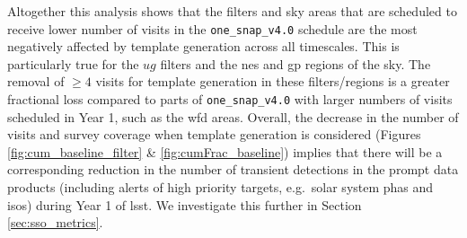 \documentclass[preprintm,linenumbers]{aastex631}
\newcommand{\baseline}{\texttt{one\_snap\_v4.0}\xspace}
\begin{document}
  Altogether this analysis shows that the filters and sky areas that are scheduled to receive lower number of visits in the \baseline schedule are the most negatively affected by template generation across all timescales.
  This is particularly true for the $ug$ filters and the \gls*{nes} and \gls*{gp} regions of the sky.
  The removal of $\geq4$ visits for template generation in these filters/regions is a greater fractional loss compared to parts of \baseline with larger numbers of visits scheduled in Year 1, such as the \gls*{wfd} areas.
		Overall, the decrease in the number of visits and survey coverage when template generation is considered (Figures \ref{fig:cum_baseline_filter} \& \ref{fig:cumFrac_baseline}) implies that there will be a corresponding reduction in the number of transient detections in the prompt data products (including alerts of high priority targets, e.g.\ solar system \glspl*{pha} and \glspl*{iso}) during Year 1 of \gls*{lsst}.
  We investigate this further in Section \ref{sec:sso_metrics}.
		\\

		
		

    			
\end{document}
